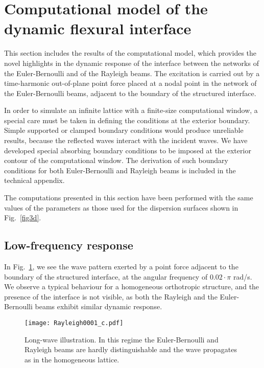 \documentclass[11pt]{article}
\begin{document}
\section{Computational model of the dynamic flexural interface}
\label{sec04}

This section includes the results of the computational model, which provides the novel highlights in the dynamic response of the interface between the networks of the Euler-Bernoulli and of the Rayleigh beams.
The excitation is carried out by a time-harmonic out-of-plane point force placed at a nodal point in the network of the Euler-Bernoulli beams, adjacent to the boundary of the structured interface.

In order to simulate an infinite lattice with a finite-size computational window, a special care must be taken in defining the conditions at the exterior boundary. Simple supported or clamped boundary conditions would produce unreliable results, because the reflected waves interact with the incident waves. We have developed special absorbing boundary conditions to be imposed at the exterior contour of the computational window. The derivation of such boundary conditions for both Euler-Bernoulli and Rayleigh beams is included in the technical appendix.

The computations presented in this section have been performed with the same values of the parameters as those used for the dispersion surfaces shown in Fig.~\ref{fig3d}.

\subsection{Low-frequency response}

In Fig.~\ref{Rayleigh0001}, we see the wave pattern exerted by a point force adjacent to the boundary of the structured interface, at the angular frequency of $0.02\!\cdot\!\pi$ rad/s. We observe a typical behaviour for a homogeneous orthotropic structure, and the presence of the interface is not visible, as both the Rayleigh and the Euler-Bernoulli beams exhibit similar dynamic response.

\begin{figure}[!htb]
\centering
\texttt{[image: Rayleigh0001\_c.pdf]}
\caption{\footnotesize
Long-wave illustration. In this regime the Euler-Bernoulli and Rayleigh beams are hardly distinguishable and the wave propagates as in the homogeneous lattice.}
\label{Rayleigh0001}
\end{figure}
\end{document}
